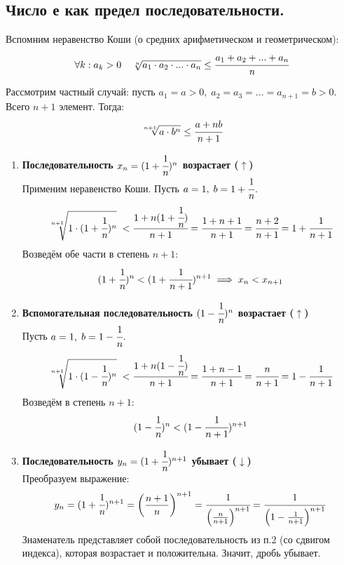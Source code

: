 \subsection{Число е как предел последовательности.}

Вспомним неравенство Коши (о средних арифметическом и геометрическом):
\[\forall k: a_k>0\;\;\;\ \sqrt[n]{a_1\cdot a_2\cdot ... \cdot a_n} \leq \cfrac{a_1+a_2+...+a_n}{n} \]

Рассмотрим частный случай: пусть $a_1 = a > 0,\; a_2=a_3=...=a_{n+1}=b>0$.
Всего $n+1$ элемент. Тогда:
\[ \sqrt[n+1]{a\cdot b^n} \leq \cfrac{a+nb}{n+1} \]

\begin{tcolorbox}[title=Доказательства монотонности последовательностей]
    \begin{enumerate}
        \item \textbf{Последовательность $x_n = (1+\cfrac{1}{n})^n$ возрастает ($\uparrow$)}\\
        Применим неравенство Коши. Пусть $a = 1,\; b=1+\cfrac{1}{n}$.
        \[ \sqrt[n+1]{1\cdot(1+\cfrac{1}{n})^n}\; < \cfrac{1+n(1+\cfrac{1}{n})}{n+1} = \cfrac{1+n+1}{n+1} = \cfrac{n+2}{n+1} = 1+\cfrac{1}{n+1} \]
        Возведём обе части в степень $n+1$:
        \[ (1+\cfrac{1}{n})^n < (1+\cfrac{1}{n+1})^{n+1} \implies x_n < x_{n+1} \]
        
        \item \textbf{Вспомогательная последовательность $(1-\cfrac{1}{n})^n$ возрастает ($\uparrow$)}\\
        Пусть $a = 1,\; b=1-\cfrac{1}{n}$.
        \[ \sqrt[n+1]{1\cdot(1-\cfrac{1}{n})^n}\; < \cfrac{1+n(1-\cfrac{1}{n})}{n+1} = \cfrac{1+n-1}{n+1} = \cfrac{n}{n+1} = 1-\cfrac{1}{n+1} \]
        Возведём в степень $n+1$:
        \[ (1-\cfrac{1}{n})^n < (1-\cfrac{1}{n+1})^{n+1} \]

        \item \textbf{Последовательность $y_n = (1+\cfrac{1}{n})^{n+1}$ убывает ($\downarrow$)}\\
        Преобразуем выражение:
        \[ y_n = (1+\cfrac{1}{n})^{n+1} = \left(\frac{n+1}{n}\right)^{n+1} = \cfrac{1}{\left(\frac{n}{n+1}\right)^{n+1}} = \cfrac{1}{\left(1-\frac{1}{n+1}\right)^{n+1}} \]
        Знаменатель представляет собой последовательность из п.2 (со сдвигом индекса), которая возрастает и положительна. Значит, дробь убывает.
    \end{enumerate}
\end{tcolorbox}

